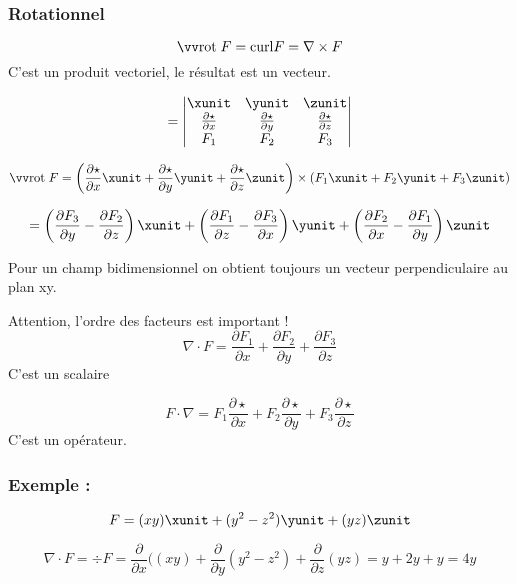 \subsubsection{Rotationnel}
\begin{mydef}
\[\rot F = \mathrm{curl }F = \nabla \times F\]
C'est un produit vectoriel, le résultat est un vecteur.

\[=
\begin{vmatrix}
\xunit & \yunit & \zunit \\
\frac{\partial \star}{\partial x} & \frac{\partial \star}{\partial y} &\frac{\partial \star}{\partial z} \\
F_1& F_2&F_3 \\
\end{vmatrix}
\]


\[\rot F = \left( \frac{\partial \star}{\partial x} \xunit +\frac{\partial \star}{\partial y} \yunit +\frac{\partial \star}{\partial z} \zunit \right) \times  (F_1 \xunit +F_2 \yunit +F_3 \zunit) \]

\[=\left( \frac{\partial F_3}{\partial y } -  \frac{\partial F_2}{\partial z }\right) \xunit
+\left( \frac{\partial F_1}{\partial z } -  \frac{\partial F_3}{\partial x }\right) \yunit
+\left( \frac{\partial F_2}{\partial x } -  \frac{\partial F_1}{\partial y }\right) \zunit
\]

Pour un champ bidimensionnel on obtient toujours un vecteur perpendiculaire au plan xy.
\end{mydef}




\begin{myrem}

Attention, l'ordre des facteurs est important !
\[\nabla \cdot F = \frac{\partial F_1}{\partial x}+ \frac{\partial F_2 }{\partial y}+ \frac{\partial F_3 }{\partial z}\] C'est un scalaire

\[F\cdot \nabla = F_1  \frac{\partial \star }{\partial x}+F_2 \frac{\partial \star }{\partial y}+ F_3  \frac{\partial \star }{\partial z}\]
C'est un opérateur.

 \end{myrem}

\subsubsection{Exemple :}

\[F=(xy)\xunit+(y^2-z^2)\yunit+(yz)\zunit\]

\[\nabla \cdot F = \div F = \frac{\partial }{\partial x} ( (xy)+\frac{\partial }{\partial y} (y^2-z^2)+\frac{\partial }{\partial z} (yz) = y+2y+y=4y\]


